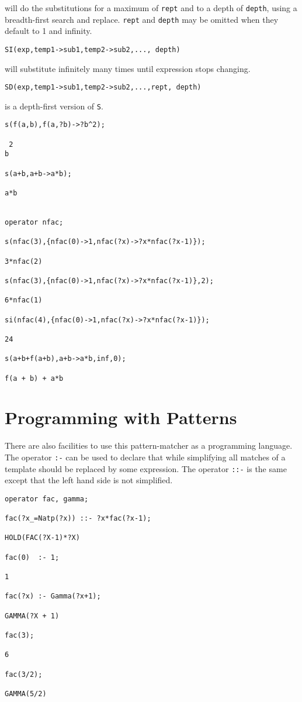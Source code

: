 \documentclass[11pt,letterpaper]{book}
\makeatletter
\newcommand{\underscore}{\_}
\newcommand{\ttindex}[1]{{\renewcommand{\_}{\protect\underscore}%
                          \index{#1@{\tt #1}}}}
\makeatother
\begin{document}
will do the substitutions for a maximum of {\tt rept} and to a depth of
{\tt depth}, using a breadth-first search and replace.  {\tt rept} and
{\tt depth} may be omitted when they default to 1 and infinity.

{\tt SI(exp,{temp1->sub1,temp2->sub2,...}, depth)}\ttindex{SI}

will substitute  infinitely many times until  expression  stops
changing.

{\tt SD(exp,{temp1->sub1,temp2->sub2,...},rept, depth)}\ttindex{SD}

is a depth-first version of {\tt S}.


{\small\begin{verbatim}
s(f(a,b),f(a,?b)->?b^2);

 2
b

s(a+b,a+b->a*b);

a*b


operator nfac;

s(nfac(3),{nfac(0)->1,nfac(?x)->?x*nfac(?x-1)});

3*nfac(2)

s(nfac(3),{nfac(0)->1,nfac(?x)->?x*nfac(?x-1)},2);

6*nfac(1)

si(nfac(4),{nfac(0)->1,nfac(?x)->?x*nfac(?x-1)});

24

s(a+b+f(a+b),a+b->a*b,inf,0);

f(a + b) + a*b

\end{verbatim}}


\section{Programming with Patterns}

There are also facilities to use this pattern-matcher as a programming
language.  The operator {\tt :-}\ttindex{:-} can be used  to declare
that while simplifying all matches of a template should be replaced by
some expression.  The operator {\tt ::-} is the same except that the
left hand side is not simplified.

{\small\begin{verbatim}
operator fac, gamma;

fac(?x_=Natp(?x)) ::- ?x*fac(?x-1);

HOLD(FAC(?X-1)*?X)

fac(0)  :- 1;

1

fac(?x) :- Gamma(?x+1);

GAMMA(?X + 1)

fac(3);

6

fac(3/2);

GAMMA(5/2)
\end{verbatim}}
\end{document}
